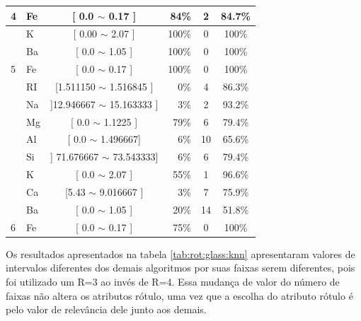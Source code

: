 \begin{table}[!h]
{\begin{tabular}{llcrcc}
\multirow{-5}{*}{4}                          & Fe    & [ 0.0 $\sim$  0.17 ]    & 84\%  & 2  & 84.7\% \\  \hline                                            
                                            & K     & [ 0.00 $\sim$  2.07 ]     & 100\%  & 0 & 100\% \\ 
                                            & Ba     & [ 0.0 $\sim$  1.05 ]    & 100\%  & 0 & 100\% \\  
\multirow{-3}{*}{5}                         & Fe    & [ 0.0 $\sim$  0.17 ]     & 100\%  & 0 & 100\% \\  \hline
                                            & RI     & [1.511150 $\sim$  1.516845 ] & 0\%  & 4  & 86.3\% \\ 
                                            & Na     & ]12.946667 $\sim$  15.163333 ] & 3\%  & 2  & 93.2\% \\ 
                                             & Mg    & [ 0.0 $\sim$  1.1225 ]    & 79\%  &6  & 79.4\%\\ 
                                             & Al    & [ 0.0 $\sim$  1.496667]      & 6\%  & 10  & 65.6\%\\
                                            & Si    & ] 71.676667 $\sim$  73.543333]      & 6\%  & 6  & 79.4\%\\
                                            & K     & [  0.0 $\sim$  2.07 ]    & 55\%  & 1  & 96.6\% \\ 
                                            & Ca     & [5.43 $\sim$ 9.016667 ]    & 3\%  & 7  & 75.9\% \\ 
                                            & Ba     & [ 0.0 $\sim$ 1.05 ]    & 20\%  & 14  & 51.8\% \\ 
\multirow{-9}{*}{6}                         & Fe    & [ 0.0 $\sim$  0.17 ]     & 75\%  & 0  & 100\% \\  \hline\hline

\end{tabular}
}
\end{table}


Os resultados apresentados na tabela \ref{tab:rot:glass:knn} apresentaram valores de intervalos diferentes dos demais algoritmos por suas faixas serem diferentes, pois foi utilizado um R=3 ao invés de R=4. Essa mudança de valor do número de faixas não altera os atributos rótulo, uma vez que a escolha do atributo rótulo é pelo valor de relevância dele junto aos demais. 

